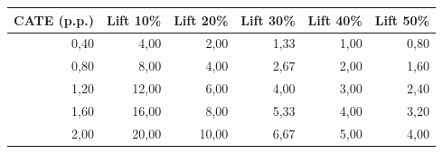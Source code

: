 \begin{tabular}{rrrrrr}
\toprule
CATE (p.p.) & Lift 10\% & Lift 20\% & Lift 30\% & Lift 40\% & Lift 50\% \\
\midrule
0,40 & 4,00 & 2,00 & 1,33 & 1,00 & 0,80 \\
0,80 & 8,00 & 4,00 & 2,67 & 2,00 & 1,60 \\
1,20 & 12,00 & 6,00 & 4,00 & 3,00 & 2,40 \\
1,60 & 16,00 & 8,00 & 5,33 & 4,00 & 3,20 \\
2,00 & 20,00 & 10,00 & 6,67 & 5,00 & 4,00 \\
\bottomrule
\end{tabular}
